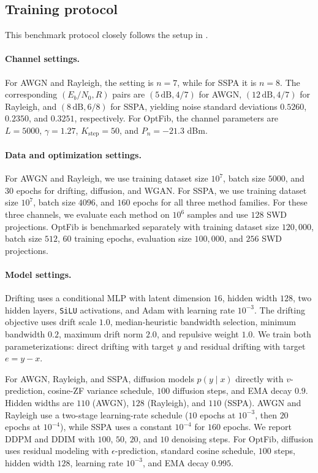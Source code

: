 \documentclass[conference]{IEEEtran}
\begin{document}
\subsection{Training protocol}
This benchmark protocol closely follows the setup in \cite{kimicc2024}.
\paragraph{Channel settings.}
For AWGN and Rayleigh, the setting is \(n=7\), while for SSPA it is \(n=8\). The corresponding \((E_b/N_0, R)\) pairs are \((5\,\mathrm{dB}, 4/7)\) for AWGN, \((12\,\mathrm{dB}, 4/7)\) for Rayleigh, and \((8\,\mathrm{dB}, 6/8)\) for SSPA, yielding noise standard deviations \(0.5260\), \(0.2350\), and \(0.3251\), respectively. For OptFib, the channel parameters are \(L=5000\), \(\gamma=1.27\), \(K_{\text{step}}=50\), and \(P_n=-21.3\) dBm.

\paragraph{Data and optimization settings.}
For AWGN and Rayleigh, we use training dataset size \(10^7\), batch size \(5000\), and \(30\) epochs for drifting, diffusion, and WGAN. For SSPA, we use training dataset size \(10^7\), batch size \(4096\), and \(160\) epochs for all three method families. For these three channels, we evaluate each method on \(10^6\) samples and use \(128\) SWD projections. OptFib is benchmarked separately with training dataset size \(120{,}000\), batch size \(512\), \(60\) training epochs, evaluation size \(100{,}000\), and \(256\) SWD projections.

\paragraph{Model settings.}
Drifting uses a conditional MLP with latent dimension \(16\), hidden width \(128\), two hidden layers, \texttt{SiLU} activations, and Adam with learning rate \(10^{-3}\). The drifting objective uses drift scale \(1.0\), median-heuristic bandwidth selection, minimum bandwidth \(0.2\), maximum drift norm \(2.0\), and repulsive weight \(1.0\). We train both parameterizations: direct drifting with target \(y\) and residual drifting with target \(e=y-x\).

For AWGN, Rayleigh, and SSPA, diffusion models \(p(y\mid x)\) directly with \(v\)-prediction, cosine-ZF variance schedule, \(100\) diffusion steps, and EMA decay \(0.9\). Hidden widths are \(110\) (AWGN), \(128\) (Rayleigh), and \(110\) (SSPA). AWGN and Rayleigh use a two-stage learning-rate schedule (\(10\) epochs at \(10^{-3}\), then \(20\) epochs at \(10^{-4}\)), while SSPA uses a constant \(10^{-4}\) for \(160\) epochs. We report DDPM and DDIM with \(100\), \(50\), \(20\), and \(10\) denoising steps. For OptFib, diffusion uses residual modeling with \(\epsilon\)-prediction, standard cosine schedule, \(100\) steps, hidden width \(128\), learning rate \(10^{-3}\), and EMA decay \(0.995\).
\end{document}
